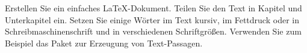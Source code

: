 Erstellen Sie ein einfaches \LaTeX-Dokument. Teilen Sie den Text in Kapitel und Unterkapitel ein. Setzen Sie einige Wörter im Text kursiv, im Fettdruck oder in Schreibmaschinenschrift und in verschiedenen Schriftgrößen. Verwenden Sie zum Beispiel das Paket  zur Erzeugung von Text-Passagen.